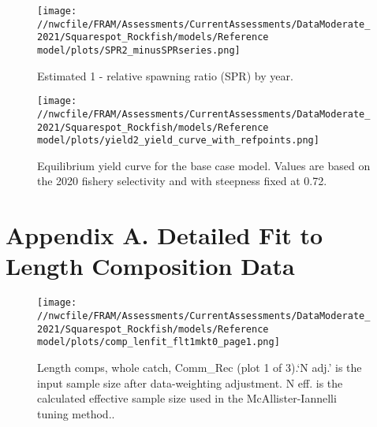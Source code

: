 \documentclass[11pt,
  english,
  a4paper,
]{article}
\begin{document}
\tagmcend\tagstructend


\begin{figure}
\centering
\texttt{[image: //nwcfile/FRAM/Assessments/CurrentAssessments/DataModerate\_2021/Squarespot\_Rockfish/models/Reference model/plots/SPR2\_minusSPRseries.png]}
\caption{Estimated 1 - relative spawning ratio (SPR) by year.\label{fig:1-spr}}
\end{figure}

\tagmcend\tagstructend


\begin{figure}
\centering
\texttt{[image: //nwcfile/FRAM/Assessments/CurrentAssessments/DataModerate\_2021/Squarespot\_Rockfish/models/Reference model/plots/yield2\_yield\_curve\_with\_refpoints.png]}
\caption{Equilibrium yield curve for the base case model. Values are based on the 2020 fishery selectivity and with steepness fixed at 0.72.\label{fig:yield}}
\end{figure}

\tagmcend\tagstructend

\newpage

\clearpage


\hypertarget{appendix-a.-detailed-fit-to-length-composition-data}{%
\section{Appendix A. Detailed Fit to Length Composition Data}\label{appendix-a.-detailed-fit-to-length-composition-data}}

\leavevmode\tagmcend\tagstructend


\begin{figure}
\centering
\texttt{[image: //nwcfile/FRAM/Assessments/CurrentAssessments/DataModerate\_2021/Squarespot\_Rockfish/models/Reference model/plots/comp\_lenfit\_flt1mkt0\_page1.png]}
\caption{Length comps, whole catch, Comm\_Rec (plot 1 of 3).`N adj.' is the input sample size after data-weighting adjustment. N eff. is the calculated effective sample size used in the McAllister-Iannelli tuning method..\label{fig:comp_lenfit_flt1mkt0_page1}}
\end{figure}
\end{document}
